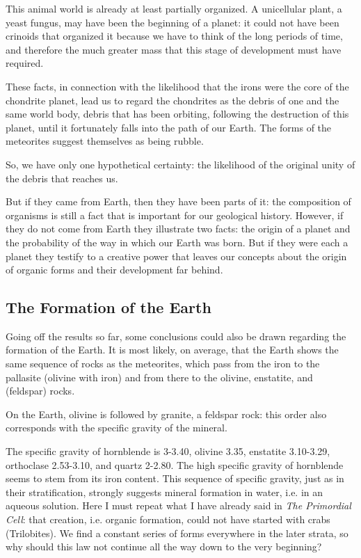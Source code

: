\documentclass[a4paper, 11pt, oneside]{article}
\begin{document}
This animal world is already at least partially organized. A unicellular plant, a yeast fungus, may have been the beginning of a planet: it could not have been crinoids that organized it because we have to think of the long periods of time, and therefore the much greater mass that this stage of development must have required.

These facts, in connection with the likelihood that the irons were the core of the chondrite planet, lead us to regard the chondrites as the debris of one and the same world body, debris that has been orbiting, following the destruction of this planet, until it fortunately falls into the path of our Earth. The forms of the meteorites suggest themselves as being rubble.

So, we have only one hypothetical certainty: the likelihood of the original unity of the debris that reaches us.

But if they came from Earth, then they have been parts of it: the composition of organisms is still a fact that is important for our geological history. However, if they do not come from Earth they illustrate two facts: the origin of a planet and the probability of the way in which our Earth was born. But if they were each a planet they testify to a creative power that leaves our concepts about the origin of organic forms and their development far behind.
\clearpage
\subsection{The Formation of the Earth}
Going off the results so far, some conclusions could also be drawn regarding the formation of the Earth. It is most likely, on average, that the Earth shows the same sequence of rocks as the meteorites, which pass from the iron to the pallasite (olivine with iron) and from there to the olivine, enstatite, and (feldspar) rocks.

On the Earth, olivine is followed by granite, a feldspar rock: this order also corresponds with the specific gravity of the mineral.

The specific gravity of hornblende is 3-3.40, olivine 3.35, enstatite 3.10-3.29, orthoclase 2.53-3.10, and quartz 2-2.80. The high specific gravity of hornblende seems to stem from its iron content. This sequence of specific gravity, just as in their stratification, strongly suggests mineral formation in water, i.e. in an aqueous solution. Here I must repeat what I have already said in \emph{The Primordial Cell}: that creation, i.e. organic formation, could not have started with crabs (Trilobites). We find a constant series of forms everywhere in the later strata, so why should this law not continue all the way down to the very beginning?
\end{document}
